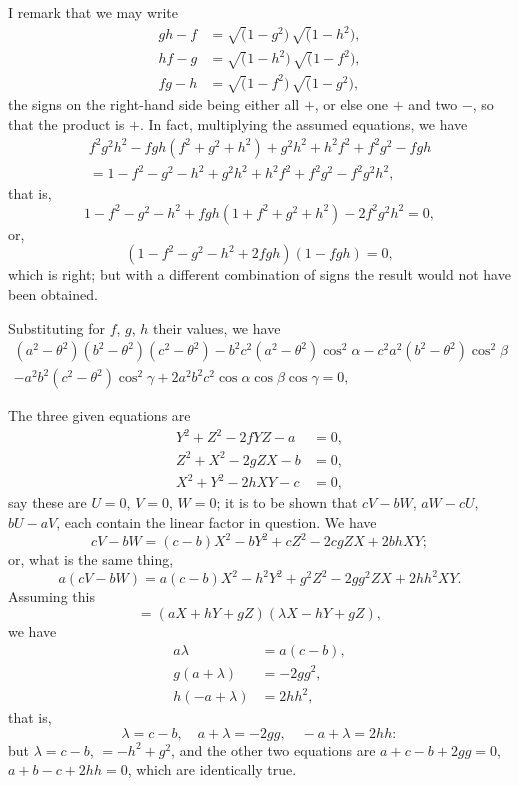 \documentclass[11pt,a4paper]{article}
\theoremstyle{plain}
\theoremstyle{definition}
\theoremstyle{remark}
\begin{document}
I remark that we may write
\begin{align*}
gh - f &= \surd(1-g^2)\,\surd(1-h^2),\\
hf - g &= \surd(1-h^2)\,\surd(1-f^2),\\
fg - h &= \surd(1-f^2)\,\surd(1-g^2),
\end{align*}
the signs on the right-hand side being either all $+$, or else one $+$ and two $-$, so that the product is $+$. In fact, multiplying the assumed equations, we have
\begin{multline}
f^2g^2h^2 - fgh(f^2+g^2+h^2) + g^2h^2 + h^2f^2 + f^2g^2 - fgh\\
= 1 - f^2 - g^2 - h^2 + g^2h^2 + h^2f^2 + f^2g^2 - f^2g^2h^2,
\end{multline}
that is,
\[
1 - f^2 - g^2 - h^2 + fgh(1+f^2+g^2+h^2) - 2f^2g^2h^2 = 0,
\]
or,
\[
(1 - f^2 - g^2 - h^2 + 2fgh)(1 - fgh) = 0,
\]
which is right; but with a different combination of signs the result would not have been obtained.

Substituting for $f$, $g$, $h$ their values, we have
\begin{multline}
(a^2-\theta^2)(b^2-\theta^2)(c^2-\theta^2) - b^2c^2(a^2-\theta^2)\cos^2\alpha - c^2a^2(b^2-\theta^2)\cos^2\beta\\
- a^2b^2(c^2-\theta^2)\cos^2\gamma + 2a^2b^2c^2\cos\alpha\cos\beta\cos\gamma = 0,
\end{multline}

The three given equations are
\begin{align*}
Y^2 + Z^2 - 2fYZ - a &= 0,\\
Z^2 + X^2 - 2gZX - b &= 0,\\
X^2 + Y^2 - 2hXY - c &= 0,
\end{align*}
say these are $U = 0$, $V = 0$, $W = 0$; it is to be shown that $cV - bW$, $aW - cU$, $bU - aV$, each contain the linear factor in question. We have
\[
cV - bW = (c-b)X^2 - bY^2 + cZ^2 - 2cgZX + 2bhXY;
\]
or, what is the same thing,
\[
a(cV - bW) = a(c-b)X^2 - h^2Y^2 + g^2Z^2 - 2gg^2ZX + 2hh^2XY.
\]
Assuming this
\[
= (aX + hY + gZ)(\lambda X - hY + gZ),
\]
we have
\begin{align*}
a\lambda &= a(c-b),\\
g(a + \lambda) &= -2gg^2,\\
h(-a + \lambda) &= 2hh^2,
\end{align*}
that is,
\[
\lambda = c-b,\quad a+\lambda = -2gg,\quad -a+\lambda = 2hh:
\]
but $\lambda = c-b$, $= -h^2+g^2$, and the other two equations are $a+c-b+2gg = 0$, $a+b-c+2hh = 0$, which are identically true.
\end{document}
